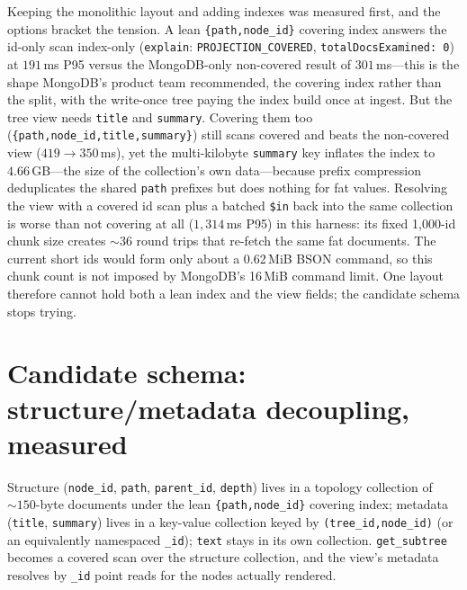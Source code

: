 \documentclass[11pt]{article}
\newcommand{\code}[1]{\texttt{#1}}
\begin{document}
Keeping the monolithic layout and adding indexes was measured first, and the
options bracket the tension. A lean \code{\{path,node\_id\}} covering index
answers the id-only scan index-only (\code{explain}: \code{PROJECTION\_COVERED},
\code{totalDocsExamined:\,0}) at $191$\,ms P95 versus the MongoDB-only
non-covered result of $301$\,ms---this is the shape MongoDB's product team recommended,
the covering index rather than the split, with the write-once tree paying the
index build once at ingest. But the tree view needs \code{title} and
\code{summary}. Covering them too (\code{\{path,node\_id,title,summary\}}) still
scans covered and beats the non-covered view ($419\to350$\,ms), yet the
multi-kilobyte \code{summary} key inflates the index to $4.66$\,GB---the size of
the collection's own data---because prefix compression deduplicates the shared
\code{path} prefixes but does nothing for fat values. Resolving the view with a
covered id scan plus a batched \code{\$in} back into the same collection is
worse than not covering at all ($1{,}314$\,ms P95) in this harness: its fixed
1{,}000-id chunk size creates ${\sim}36$ round trips that re-fetch the same fat
documents. The current short ids would form only about a 0.62\,MiB BSON command,
so this chunk count is not imposed by MongoDB's 16\,MiB command limit. One
layout therefore cannot hold both a lean index and the view fields; the candidate
schema stops trying.

\section{Candidate schema: structure/metadata decoupling,
measured}\label{sec:kv}

Structure (\code{node\_id}, \code{path}, \code{parent\_id}, \code{depth}) lives
in a topology collection of ${\sim}150$-byte documents under the lean
\code{\{path,node\_id\}} covering index; metadata (\code{title}, \code{summary})
lives in a key-value collection keyed by \code{(tree\_id,node\_id)} (or an
equivalently namespaced \code{\_id}); \code{text} stays in its own collection.
\code{get\_subtree} becomes a covered scan over the
structure collection, and the view's metadata resolves by \code{\_id} point
reads for the nodes actually rendered.
\end{document}
